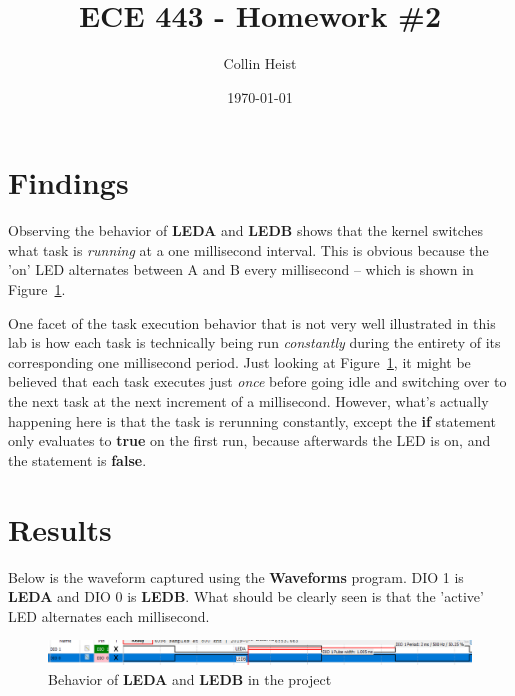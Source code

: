 \documentclass[a4paper, 12pt]{article}
\begin{document}
\title{ECE 443 - Homework \#2}
\author{Collin Heist}
\date{\today}
\maketitle
{}

\section{Findings}
Observing the behavior of \textbf{LEDA} and \textbf{LEDB} shows that the kernel switches what task is \emph{running} at a one millisecond interval. This is obvious because the 'on' LED alternates between A and B every millisecond -- which is shown in Figure~\ref{fig:img00}.

One facet of the task execution behavior that is not very well illustrated in this lab is how each task is technically being run \emph{constantly} during the entirety of its corresponding one millisecond period. Just looking at Figure~\ref{fig:img00}, it might be believed that each task executes just \emph{once} before going idle and switching over to the next task at the next increment of a millisecond. However, what's actually happening here is that the task is rerunning constantly, except the \textbf{if} statement only evaluates to \textbf{true} on the first run, because afterwards the LED is on, and the statement is \textbf{false}.

\section{Results}
Below is the waveform captured using the \textbf{Waveforms} program. DIO 1 is \textbf{LEDA} and DIO 0 is \textbf{LEDB}. What should be clearly seen is that the 'active' LED alternates each millisecond.

\begin{figure}[H]
\centering

\includegraphics[width=\textwidth]{img00.png}
\caption{Behavior of \textbf{LEDA} and \textbf{LEDB} in the project}
\label{fig:img00}
\end{figure}
\end{document}
